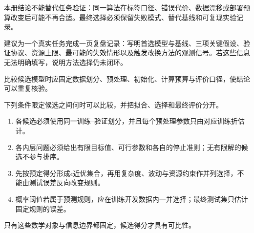 \begin{SLCompactClosure}
\begin{warningbox}
本册结论不能替代任务验证：同一算法在标签口径、错误代价、数据漂移或部署预算改变后可能不再合适。最终选择必须保留失败模式、替代基线和可复现实验记录。

建议为一个真实任务完成一页复盘记录：写明首选模型与基线、三项关键假设、验证协议、资源上限、最可能的失效情形以及触发改换方法的观测信号。若这些信息无法明确填写，说明方法选择仍未闭环。

比较候选模型时应固定数据划分、预处理、初始化、计算预算与评价口径，使结论可以重复核验。
\end{warningbox}

\begin{keypointbox}[title=模型选择的数学核对条件]
下列条件限定候选之间何时可以比较，并把拟合、选择和最终评价分开。
\begin{enumerate}[leftmargin=2.2em,nosep]
  \item 各候选必须使用同一训练--验证划分，并且每个预处理参数只由对应训练折估计。
  \item 各内层问题必须给出有限目标值、可行参数和各自的停止准则；无有限解的候选不参与排序。
  \item 先按预定得分形成$\epsilon$近优集合，再用复杂度、波动与资源约束作并列选择，不能由测试误差反向改变规则。
  \item 概率阈值若属于预测规则，应在训练开发数据内一并选择；最终测试集只估计固定规则的误差。
\end{enumerate}
只有这些数学对象与信息边界都固定，候选得分才具有可比性。
\end{keypointbox}
\end{SLCompactClosure}
